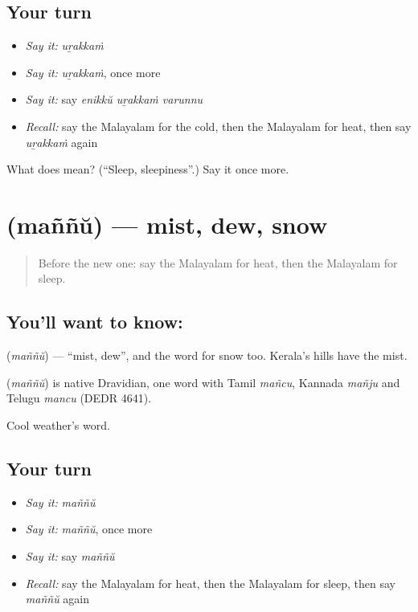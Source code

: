 \subsection*{Your turn}
\begin{itemize}
\raggedright
  \item \emph{Say it:} \emph{uṟakkaṁ}
  \item \emph{Say it:} \emph{uṟakkaṁ}, once more
  \item \emph{Say it:} say \emph{enikkŭ uṟakkaṁ varunnu}
  \item \emph{Recall:} say the Malayalam for the cold, then the Malayalam for heat, then say \emph{uṟakkaṁ} again
\end{itemize}

\begin{tcolorbox}[breakable,colback=teal!4,colframe=teal!35!black,title={Before you move on}]
What does  mean? (\textquotedblleft{}Sleep, sleepiness\textquotedblright{}.) Say it once more.
\end{tcolorbox}
\section[\texorpdfstring{\ml{മഞ്ഞ്} (maññŭ)}{മഞ്ഞ് (maññŭ)}]{ (maññŭ) — mist, dew, snow}

\label{lesson:ML-C118-mist}



\begin{quote}
Before the new one: say the Malayalam for heat, then the Malayalam for sleep.
\end{quote}

\subsection*{You'll want to know: }
\textbf{} (\emph{maññŭ}) — \textquotedblleft{}mist, dew\textquotedblright{}, and the word for snow too. Kerala's hills have the mist.

\begin{cousinweb}
\textbf{} (\emph{maññŭ}) is native Dravidian, one word with Tamil \emph{mañcu}, Kannada \emph{mañju} and Telugu \emph{mancu} (DEDR 4641).
\end{cousinweb}

\begin{grammarlens}[title={What you've built}]
Cool weather's word.
\end{grammarlens}

\subsection*{Your turn}
\begin{itemize}
\raggedright
  \item \emph{Say it:} \emph{maññŭ}
  \item \emph{Say it:} \emph{maññŭ}, once more
  \item \emph{Say it:} say \emph{maññŭ}
  \item \emph{Recall:} say the Malayalam for heat, then the Malayalam for sleep, then say \emph{maññŭ} again
\end{itemize}

